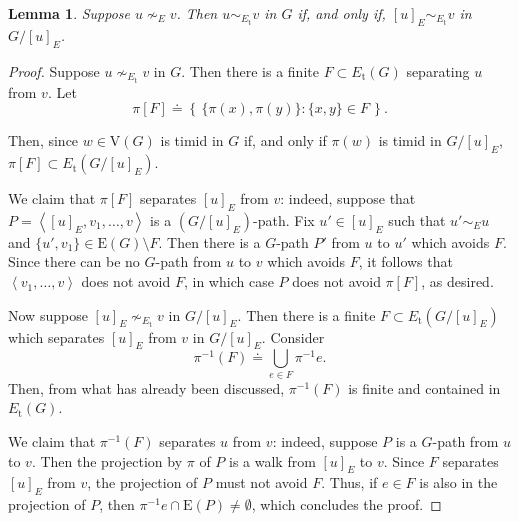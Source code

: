 \documentclass[10pt]{article}
\numberwithin{equation}{subsection}
\newtheorem{lemma}[equation]{Lemma}
\theoremstyle{remark}
\newcommand{\set}[1]{\left\{\, {#1} \,\right\}}
\newcommand{\seqq}[1]{{\left\langle {#1} \right\rangle}}
\begin{document}
\begin{lemma}\label{LEMMA_TimidEqvClassQuot}
    Suppose $u\nsim_E v$. Then $u\sim_{E_\mathrm{t}} v$ in $G$ if, and only if, $[u]_E\sim_{E_\mathrm{t}} v$ in $G/[u]_E$.
\end{lemma}
\begin{proof}
    Suppose $u\nsim_{E_\mathrm{t}} v$ in $G$. Then there is a finite $F\subset E_\mathrm{t}(G)$ separating $u$ from $v$. Let
    \[\pi[F] \doteq \set{\{\pi(x),\pi(y)\}:\{x,y\}\in F}.\]

    Then, since $w\in \mathrm{V}(G)$ is timid in $G$ if, and only if $\pi(w)$ is timid in $G/[u]_E$, $\pi[F]\subset E_\mathrm{t}(G/[u]_E)$. 
    
    We claim that $\pi[F]$ separates $[u]_E$ from $v$: indeed, suppose that $P=\seqq{[u]_E, v_1, \dotsc, v}$ is a $(G/[u]_E)$-path. Fix $u'\in [u]_E$ such that $u'\sim_E u$ and $\{u',v_1\}\in \mathrm{E}(G)\setminus F$. Then there is a $G$-path $P'$ from $u$ to $u'$ which avoids $F$. Since there can be no $G$-path from $u$ to $v$ which avoids $F$, it follows that $\seqq{v_1, \dotsc, v}$ does not avoid $F$, in which case $P$ does not avoid $\pi[F]$, as desired.

    Now suppose $[u]_E\nsim_{E_\mathrm{t}} v$ in $G/[u]_E$. Then there is a finite $F\subset E_\mathrm{t}(G/[u]_E)$ which separates $[u]_E$ from $v$ in $G/[u]_E$. Consider 
    \[\pi^{-1}(F) \doteq \bigcup_{e\in F}\pi^{-1}e.\]
    Then, from what has already been discussed, $\pi^{-1}(F)$ is finite and contained in $E_\mathrm{t}(G)$.

    We claim that $\pi^{-1}(F)$ separates $u$ from $v$: indeed, suppose $P$ is a $G$-path from $u$ to $v$. Then the projection by $\pi$ of $P$ is a walk from $[u]_E$ to $v$. Since $F$ separates $[u]_E$ from $v$, the projection of $P$ must not avoid $F$. Thus, if $e\in F$ is also in the projection of $P$, then $\pi^{-1}e\cap \mathrm{E}(P)\neq \emptyset$, which concludes the proof.   
\end{proof}
\end{document}
